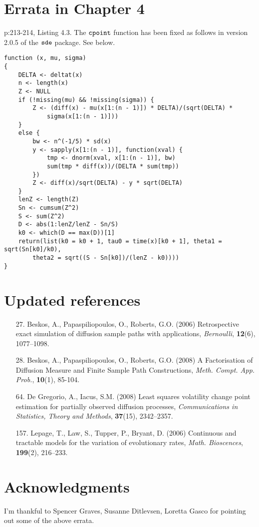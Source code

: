 \documentclass[11pt]{article}
\begin{document}
\section*{Errata in Chapter 4}
p:213-214, Listing 4.3. The $\tt cpoint$ function has been fixed as follows in 
version 2.0.5 of the $\tt sde$ package. See below.
\vspace{-0.5cm}
{\scriptsize
\begin{verbatim}
function (x, mu, sigma) 
{
    DELTA <- deltat(x)
    n <- length(x)
    Z <- NULL
    if (!missing(mu) && !missing(sigma)) {
        Z <- (diff(x) - mu(x[1:(n - 1)]) * DELTA)/(sqrt(DELTA) * 
            sigma(x[1:(n - 1)]))
    }
    else {
        bw <- n^(-1/5) * sd(x)
        y <- sapply(x[1:(n - 1)], function(xval) {
            tmp <- dnorm(xval, x[1:(n - 1)], bw)
            sum(tmp * diff(x))/(DELTA * sum(tmp))
        })
        Z <- diff(x)/sqrt(DELTA) - y * sqrt(DELTA)
    }
    lenZ <- length(Z)
    Sn <- cumsum(Z^2)
    S <- sum(Z^2)
    D <- abs(1:lenZ/lenZ - Sn/S)
    k0 <- which(D == max(D))[1]
    return(list(k0 = k0 + 1, tau0 = time(x)[k0 + 1], theta1 = sqrt(Sn[k0]/k0), 
        theta2 = sqrt((S - Sn[k0])/(lenZ - k0))))
}
\end{verbatim}
}
\section*{Updated references}
\begin{itemize}
\item[27.]  Beskos, A., Papaspiliopoulos, O., Roberts, G.O. (2006) Retrospective exact 
simulation of diffusion sample paths with applications, {\it Bernoulli}, {\bf 12}(6), 1077--1098.
\item[28.] Beskos, A., Papaspiliopoulos, O., Roberts, G.O. (2008) A Factorisation of Diffusion Measure and Finite Sample Path Constructions, {\it Meth. Compt. App. Prob.}, {\bf 10}(1), 85-104.
\item[64.] De Gregorio, A., Iacus, S.M. (2008) Least squares volatility change point estimation for 
partially observed diffusion processes, {\it Communications in Statistics, Theory and Methods},  {\bf 37}(15), 2342--2357. 
\item[157.] Lepage, T., Law, S., Tupper, P., Bryant, D. (2006) Continuous and tractable models for the variation of evolutionary rates, {\it Math. Bioscences}, {\bf 199}(2), 216--233.

\end{itemize}

\section*{Acknowledgments}
I'm thankful to Spencer Graves, Susanne Ditlevsen, Loretta Gasco for pointing out some of the above errata.
\end{document}
